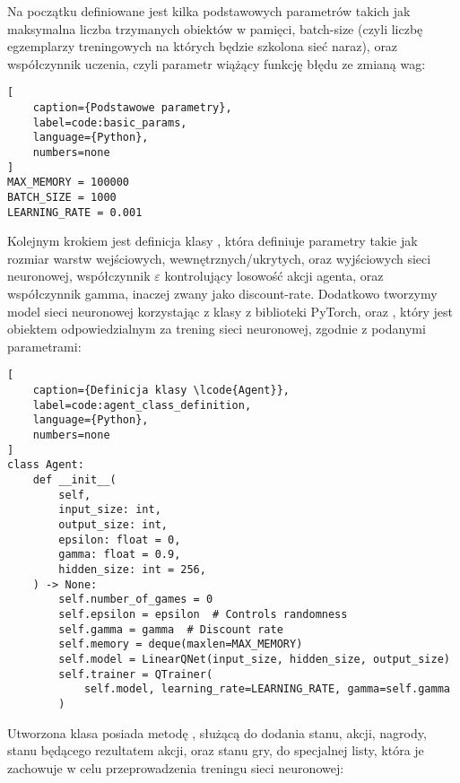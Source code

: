 Na początku definiowane jest kilka podstawowych parametrów takich jak maksymalna liczba trzymanych obiektów w pamięci, batch-size \cite{BatchNormalization} (czyli liczbę egzemplarzy treningowych na których będzie szkolona sieć naraz), oraz współczynnik uczenia, czyli parametr wiążący funkcję błędu ze zmianą wag:

\begin{onepage}
    \begin{lstlisting}[
    caption={Podstawowe parametry},
    label=code:basic_params,
    language={Python},
    numbers=none
]
MAX_MEMORY = 100000
BATCH_SIZE = 1000
LEARNING_RATE = 0.001
    \end{lstlisting}
\end{onepage}

\clearpage

Kolejnym krokiem jest definicja klasy , która definiuje parametry takie jak rozmiar warstw wejściowych, wewnętrznych/ukrytych, oraz wyjściowych sieci neuronowej, współczynnik $\varepsilon$ kontrolujący losowość akcji agenta, oraz współczynnik gamma, inaczej zwany jako discount-rate. Dodatkowo tworzymy model sieci neuronowej  korzystając z klasy  z biblioteki PyTorch, oraz , który jest obiektem odpowiedzialnym za trening sieci neuronowej, zgodnie z podanymi parametrami:

\begin{onepage}
    \begin{lstlisting}[
    caption={Definicja klasy \lcode{Agent}},
    label=code:agent_class_definition,
    language={Python},
    numbers=none
]
class Agent:
    def __init__(
        self,
        input_size: int,
        output_size: int,
        epsilon: float = 0,
        gamma: float = 0.9,
        hidden_size: int = 256,
    ) -> None:
        self.number_of_games = 0
        self.epsilon = epsilon  # Controls randomness
        self.gamma = gamma  # Discount rate
        self.memory = deque(maxlen=MAX_MEMORY)
        self.model = LinearQNet(input_size, hidden_size, output_size)
        self.trainer = QTrainer(
            self.model, learning_rate=LEARNING_RATE, gamma=self.gamma
        )
    \end{lstlisting}
\end{onepage}

Utworzona klasa posiada metodę , służącą do dodania stanu, akcji, nagrody, stanu będącego rezultatem akcji, oraz stanu gry, do specjalnej listy, która je zachowuje w celu przeprowadzenia treningu sieci neuronowej:


